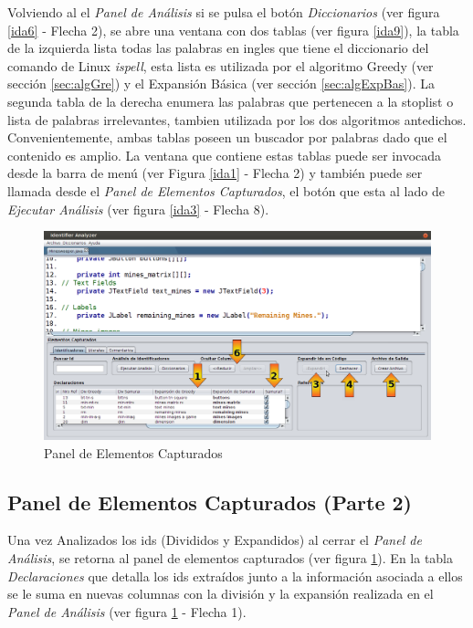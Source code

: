 \documentclass[a4paper,12pt]{report}
\begin{document}
Volviendo al el \textit{Panel de Análisis} si se pulsa el botón \textit{Diccionarios} (ver figura \ref{ida6} - Flecha 2), se abre una ventana con dos tablas (ver figura \ref{ida9}), la tabla de la izquierda lista todas las palabras en ingles que tiene el diccionario del comando de Linux \textit{ispell}, esta lista es utilizada por el algoritmo Greedy (ver sección \ref{sec:algGre}) y el Expansión Básica (ver sección \ref{sec:algExpBas}). La segunda tabla de la derecha enumera las palabras que pertenecen a la stoplist o lista de palabras irrelevantes, tambien utilizada por los dos algoritmos antedichos. Convenientemente, ambas tablas poseen un buscador por palabras dado que el contenido es amplio. La ventana que contiene estas tablas puede ser invocada desde la barra de menú (ver Figura \ref{ida1} - Flecha 2) y también puede ser llamada desde el \textit{Panel de Elementos Capturados}, el botón que esta al lado de \textit{Ejecutar Análisis} (ver figura \ref{ida3} - Flecha 8).

\begin{figure}[t] %
\centerline{%
\includegraphics[scale= 0.42]{./ida_10.png}
}
\caption{Panel de Elementos Capturados}
\label{ida10}
\end{figure}

\subsection{Panel de Elementos Capturados (Parte 2)}

Una vez Analizados los ids (Divididos y Expandidos) al cerrar el \textit{Panel de Análisis}, se retorna al panel de elementos capturados (ver figura \ref{ida10}). En la tabla \textit{Declaraciones} que detalla los ids extraídos junto a la información asociada a ellos se le suma en nuevas columnas con la división y la expansión realizada en el \textit{Panel de Análisis} (ver figura \ref{ida10} - Flecha 1).
\end{document}
